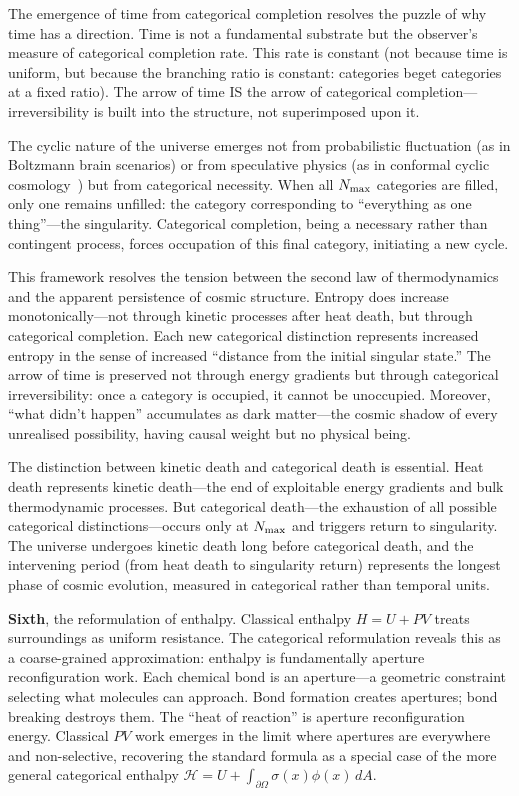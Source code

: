 The emergence of time from categorical completion resolves the puzzle of why time has a direction. Time is not a fundamental substrate but the observer's measure of categorical completion rate. This rate is constant (not because time is uniform, but because the branching ratio is constant: categories beget categories at a fixed ratio). The arrow of time IS the arrow of categorical completion---irreversibility is built into the structure, not superimposed upon it.

The cyclic nature of the universe emerges not from probabilistic fluctuation (as in Boltzmann brain scenarios) or from speculative physics (as in conformal cyclic cosmology~\citep{penrose2010cycles}) but from categorical necessity. When all $N_{\text{max}}$ categories are filled, only one remains unfilled: the category corresponding to ``everything as one thing''---the singularity. Categorical completion, being a necessary rather than contingent process, forces occupation of this final category, initiating a new cycle.

This framework resolves the tension between the second law of thermodynamics and the apparent persistence of cosmic structure. Entropy does increase monotonically---not through kinetic processes after heat death, but through categorical completion. Each new categorical distinction represents increased entropy in the sense of increased ``distance from the initial singular state.'' The arrow of time is preserved not through energy gradients but through categorical irreversibility: once a category is occupied, it cannot be unoccupied. Moreover, ``what didn't happen'' accumulates as dark matter---the cosmic shadow of every unrealised possibility, having causal weight but no physical being.

The distinction between kinetic death and categorical death is essential. Heat death represents kinetic death---the end of exploitable energy gradients and bulk thermodynamic processes. But categorical death---the exhaustion of all possible categorical distinctions---occurs only at $N_{\text{max}}$ and triggers return to singularity. The universe undergoes kinetic death long before categorical death, and the intervening period (from heat death to singularity return) represents the longest phase of cosmic evolution, measured in categorical rather than temporal units.

\textbf{Sixth}, the reformulation of enthalpy. Classical enthalpy $H = U + PV$ treats surroundings as uniform resistance. The categorical reformulation reveals this as a coarse-grained approximation: enthalpy is fundamentally aperture reconfiguration work. Each chemical bond is an aperture---a geometric constraint selecting what molecules can approach. Bond formation creates apertures; bond breaking destroys them. The ``heat of reaction'' is aperture reconfiguration energy. Classical $PV$ work emerges in the limit where apertures are everywhere and non-selective, recovering the standard formula as a special case of the more general categorical enthalpy $\mathcal{H} = U + \int_{\partial\Omega} \sigma(x) \phi(x) \, dA$.

